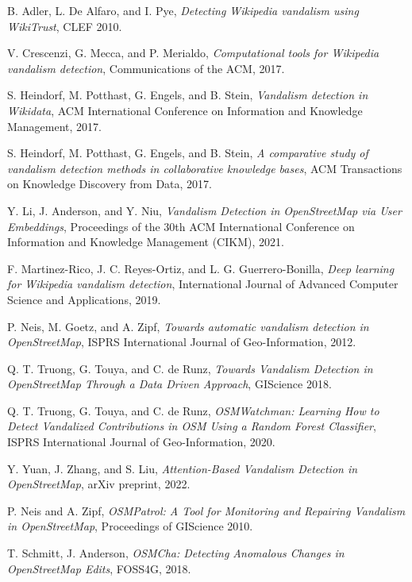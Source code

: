 \documentclass[
    13pt, %
    a4paper, %
    DIV14, %
    listof=totoc, %
    bibliography=totoc, %
    index=totoc, %
    headsepline
]{scrreprt}
\begin{document}
\begin{thebibliography}{9}
B. Adler, L. De Alfaro, and I. Pye,
\textit{Detecting Wikipedia vandalism using WikiTrust},
CLEF 2010.

V. Crescenzi, G. Mecca, and P. Merialdo,
\textit{Computational tools for Wikipedia vandalism detection},
Communications of the ACM, 2017.

S. Heindorf, M. Potthast, G. Engels, and B. Stein,
\textit{Vandalism detection in Wikidata},
ACM International Conference on Information and Knowledge Management, 2017.

S. Heindorf, M. Potthast, G. Engels, and B. Stein,
\textit{A comparative study of vandalism detection methods in collaborative knowledge bases},
ACM Transactions on Knowledge Discovery from Data, 2017.

Y. Li, J. Anderson, and Y. Niu,
\textit{Vandalism Detection in OpenStreetMap via User Embeddings},
Proceedings of the 30th ACM International Conference on Information and Knowledge Management (CIKM), 2021.

F. Martinez-Rico, J. C. Reyes-Ortiz, and L. G. Guerrero-Bonilla,
\textit{Deep learning for Wikipedia vandalism detection},
International Journal of Advanced Computer Science and Applications, 2019.

P. Neis, M. Goetz, and A. Zipf,
\textit{Towards automatic vandalism detection in OpenStreetMap},
ISPRS International Journal of Geo-Information, 2012.

Q. T. Truong, G. Touya, and C. de Runz,
\textit{Towards Vandalism Detection in OpenStreetMap Through a Data Driven Approach},
GIScience 2018.

Q. T. Truong, G. Touya, and C. de Runz,
\textit{OSMWatchman: Learning How to Detect Vandalized Contributions in OSM Using a Random Forest Classifier},
ISPRS International Journal of Geo-Information, 2020.

Y. Yuan, J. Zhang, and S. Liu,
\textit{Attention-Based Vandalism Detection in OpenStreetMap},
arXiv preprint, 2022.

P. Neis and A. Zipf,
\textit{OSMPatrol: A Tool for Monitoring and Repairing Vandalism in OpenStreetMap},
Proceedings of GIScience 2010.

T. Schmitt, J. Anderson,
\textit{OSMCha: Detecting Anomalous Changes in OpenStreetMap Edits},
FOSS4G, 2018.


\end{thebibliography}
\end{document}
